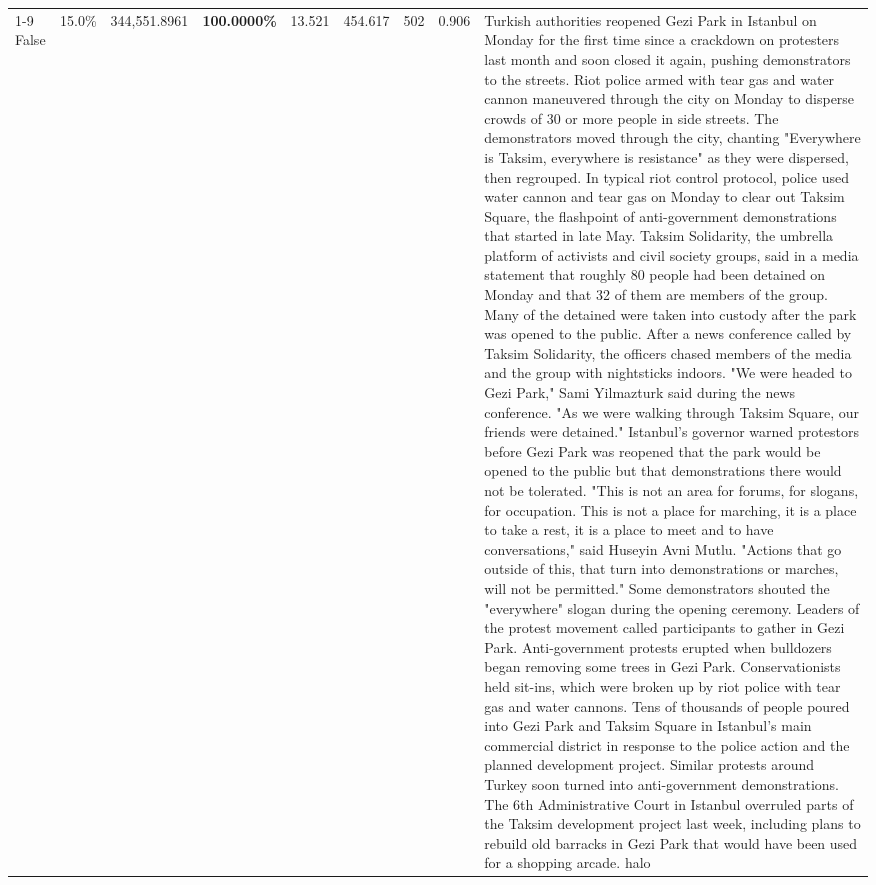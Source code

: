 \begin{table}[H]
\begin{tabular}{lllrlllll}
\cline{1-9}
False & 15.0\% & 344,551.8961 & \bfseries \color{red} 100.0000\% & 13.521 & 454.617 & 502 & 0.906 & Turkish authorities reopened Gezi Park in Istanbul on Monday for the first time since a crackdown on protesters last month and soon closed it again, pushing demonstrators to the streets. Riot police armed with tear gas and water cannon maneuvered through the city on Monday to disperse crowds of 30 or more people in side streets. The demonstrators moved through the city, chanting "Everywhere is Taksim, everywhere is resistance" as they were dispersed, then regrouped. In typical riot control protocol, police used water cannon and tear gas on Monday to clear out Taksim Square, the flashpoint of anti-government demonstrations that started in late May. Taksim Solidarity, the umbrella platform of activists and civil society groups, said in a media statement that roughly 80 people had been detained on Monday and that 32 of them are members of the group. Many of the detained were taken into custody after the park was opened to the public. After a news conference called by Taksim Solidarity, the officers chased members of the media and the group with nightsticks indoors. "We were headed to Gezi Park," Sami Yilmazturk said during the news conference. "As we were walking through Taksim Square, our friends were detained." Istanbul's governor warned protestors before Gezi Park was reopened that the park would be opened to the public but that demonstrations there would not be tolerated. "This is not an area for forums, for slogans, for occupation. This is not a place for marching, it is a place to take a rest, it is a place to meet and to have conversations," said Huseyin Avni Mutlu. "Actions that go outside of this, that turn into demonstrations or marches, will not be permitted." Some demonstrators shouted the "everywhere" slogan during the opening ceremony. Leaders of the protest movement called participants to gather in Gezi Park. Anti-government protests erupted when bulldozers began removing some trees in Gezi Park. Conservationists held sit-ins, which were broken up by riot police with tear gas and water cannons. Tens of thousands of people poured into Gezi Park and Taksim Square in Istanbul's main commercial district in response to the police action and the planned development project. Similar protests around Turkey soon turned into anti-government demonstrations. The 6th Administrative Court in Istanbul overruled parts of the Taksim development project last week, including plans to rebuild old barracks in Gezi Park that would have been used for a shopping arcade. halo \\

\end{tabular}
\end{table}
